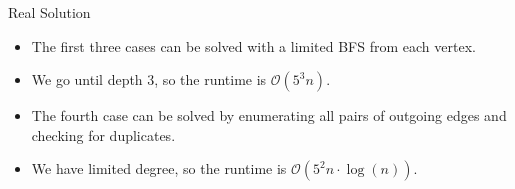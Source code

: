 \begin{slide}
\begin{block}{Real Solution}
\begin{overprint}
			\begin{itemize}
				\item The first three cases can be solved with a limited BFS from each vertex.
				\item We go until depth $3$, so the runtime is $\mathcal{O}(5^3n)$.
			\end{itemize}
			\begin{itemize}
				\item The fourth case can be solved by enumerating all pairs of outgoing edges and checking for duplicates.
				\item We have limited degree, so the runtime is $\mathcal{O}(5^2n\cdot\log(n))$.
			\end{itemize}
		\end{overprint}
	\end{block}
\end{slide}
